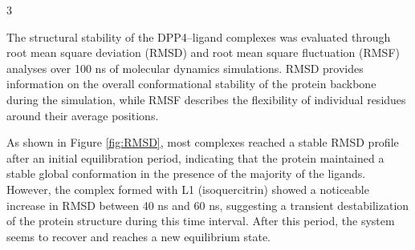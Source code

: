 \documentclass[portrait,final,20pt,ra0]{sciposter}
\begin{document}
\begin{multicols*}{3}
\begin{center}
\label{fig:barplot}
\end{center}


The structural stability of the DPP4--ligand complexes was evaluated through root mean square deviation (RMSD) and root mean square fluctuation (RMSF) analyses over 100 ns of molecular dynamics simulations. RMSD provides information on the overall conformational stability of the protein backbone during the simulation, while RMSF describes the flexibility of individual residues around their average positions.

As shown in Figure \ref{fig:RMSD}, most complexes reached a stable RMSD profile after an initial equilibration period, indicating that the protein maintained a stable global conformation in the presence of the majority of the ligands. However, the complex formed with L1 (isoquercitrin) showed a noticeable increase in RMSD between 40 ns and 60 ns, suggesting a transient destabilization of the protein structure during this time interval. After this period, the system seems to recover and reaches a new equilibrium state.


\end{multicols*}
\end{document}
